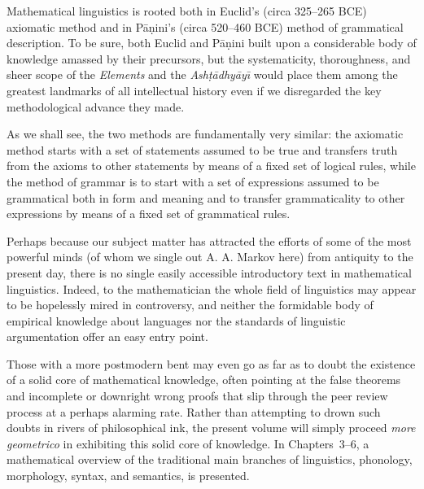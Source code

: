 \preface %

Mathematical linguistics is rooted both in Euclid's (circa 325--265 BCE)
axiomatic method and in P\={a}\d{n}ini's (circa 520--460 BCE) method of
grammatical description. To be sure, both Euclid and P\={a}\d{n}ini built upon
a considerable body of knowledge amassed by their precursors, but the
systematicity, thoroughness, and sheer scope of the {\it Elements} and the
{\it Ash\d{t}\={a}dhy\={a}y\={\i}} would place them among the greatest
landmarks of all intellectual history even if we disregarded the key
methodological advance they made.  

As we shall see, the two methods are fundamentally very similar: the axiomatic
method starts with a set of statements assumed to be true and transfers truth
from the axioms to other statements by means of a fixed set of logical rules,
while the method of grammar is to start with a set of expressions assumed to
be grammatical both in form and meaning and to transfer grammaticality to
other expressions by means of a fixed set of grammatical rules. 

Perhaps because our subject matter has attracted the efforts of some of the
most powerful minds (of whom we single out A. A. Markov here) from antiquity
to the present day, there is no single easily accessible introductory text in
mathematical linguistics. Indeed, to the mathematician the whole field of
linguistics may appear to be hopelessly mired in controversy, and neither the
formidable body of empirical knowledge about languages nor the standards of
linguistic argumentation offer an easy entry point. 

Those with a more postmodern bent may even go as far as to doubt the existence
of a solid core of mathematical knowledge, often pointing at the false
theorems and incomplete or downright wrong proofs that slip through the peer
review process at a perhaps alarming rate. Rather than attempting to drown
such doubts in rivers of philosophical ink, the present volume will simply
proceed {\it more geometrico} in exhibiting this solid core of knowledge. In
Chapters~3--6, a mathematical overview of the traditional main branches of
linguistics, phonology, morphology, syntax, and semantics, is presented. 

